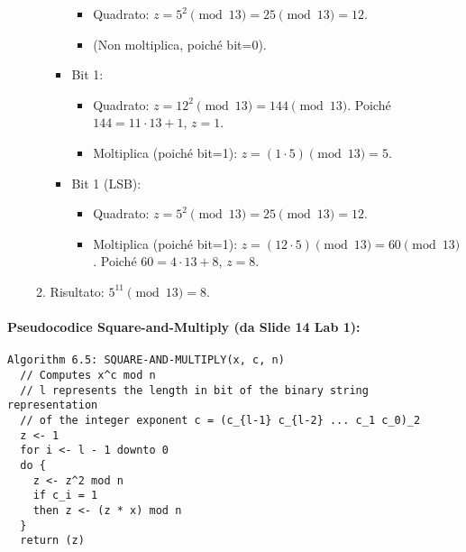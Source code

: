 \begin{itemize}
\begin{enumerate}
\begin{itemize}
                \begin{itemize}
                    \item Quadrato: \(z = 5^2 \pmod{13} = 25 \pmod{13} = 12\).
                    \item (Non moltiplica, poiché bit=0).
                \end{itemize}
            \item Bit 1:
                \begin{itemize}
                    \item Quadrato: \(z = 12^2 \pmod{13} = 144 \pmod{13}\). Poiché \(144 = 11 \cdot 13 + 1\), \(z=1\).
                    \item Moltiplica (poiché bit=1): \(z = (1 \cdot 5) \pmod{13} = 5\).
                \end{itemize}
            \item Bit 1 (LSB):
                \begin{itemize}
                    \item Quadrato: \(z = 5^2 \pmod{13} = 25 \pmod{13} = 12\).
                    \item Moltiplica (poiché bit=1): \(z = (12 \cdot 5) \pmod{13} = 60 \pmod{13}\). Poiché \(60 = 4 \cdot 13 + 8\), \(z=8\).
                \end{itemize}
        \end{itemize}
        \item Risultato: \(5^{11} \pmod{13} = 8\).
    \end{enumerate}
\end{itemize}

\paragraph{Pseudocodice Square-and-Multiply (da Slide 14 Lab 1):}
\begin{verbatim}
Algorithm 6.5: SQUARE-AND-MULTIPLY(x, c, n)
  // Computes x^c mod n
  // l represents the length in bit of the binary string representation
  // of the integer exponent c = (c_{l-1} c_{l-2} ... c_1 c_0)_2
  z <- 1
  for i <- l - 1 downto 0
  do {
    z <- z^2 mod n
    if c_i = 1
    then z <- (z * x) mod n
  }
  return (z)
\end{verbatim}

